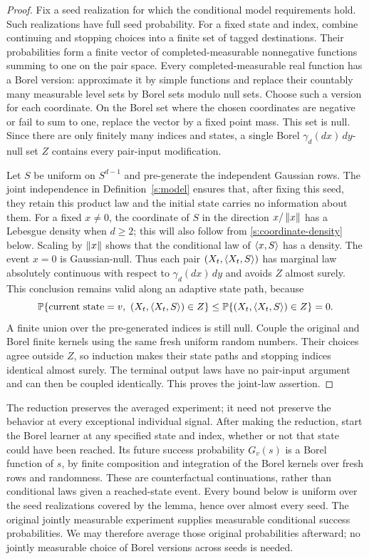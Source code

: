 \begin{proof}
Fix a seed realization for which the conditional model requirements
hold. Such realizations have full seed probability.
For a fixed state and index, combine continuing and stopping choices
into a finite set of tagged destinations. Their probabilities form a
finite vector of completed-measurable nonnegative functions summing to
one on the pair space. Every completed-measurable real function has a
Borel version: approximate it by simple functions and replace their
countably many measurable level sets by Borel sets modulo null sets.
Choose such a version for each coordinate. On the Borel set where the
chosen coordinates are negative or fail to sum to one, replace the
vector by a fixed point mass. This set is null. Since there are only
finitely many indices and states, a single Borel
\(\gamma_d(dx)\,dy\)-null set \(Z\) contains every pair-input
modification.

Let \(S\) be uniform on \(S^{d-1}\) and pre-generate the independent
Gaussian rows. The joint independence in Definition~\ref{s:model}
ensures that, after fixing this seed, they retain this product law and
the initial state carries no information about them. For a fixed
\(x\ne0\), the coordinate of \(S\) in the
direction \(x/\left\lVert x\right\rVert\) has a Lebesgue density when \(d\ge2\); this
will also follow from \eqref{s:coordinate-density} below. Scaling by
\(\left\lVert x\right\rVert\) shows that the conditional law of \(\langle x,S\rangle\) has a
density. The event \(x=0\) is Gaussian-null. Thus each pair
\((X_t,\langle X_t,S\rangle)\) has marginal law absolutely continuous with
respect to \(\gamma_d(dx)\,dy\) and avoids \(Z\) almost surely.
This conclusion remains valid along an adaptive state path, because
\[
 \mathbb P\{\text{current state}=v,\ (X_t,\langle X_t,S\rangle)\in Z\}
 \le \mathbb P\{(X_t,\langle X_t,S\rangle)\in Z\}=0.
\]
A finite union over the pre-generated indices is still null. Couple the
original and Borel finite kernels using the same fresh uniform random
numbers. Their choices agree outside \(Z\), so induction makes their
state paths and stopping indices identical almost surely. The terminal
output laws have no pair-input argument and can then be coupled
identically. This proves the joint-law assertion.
\end{proof}

The reduction preserves the averaged experiment; it need not preserve
the behavior at every exceptional individual signal. After making the
reduction, start the Borel learner at any specified state and index,
whether or not that state could have been reached. Its future success
probability \(G_v(s)\) is a Borel function of \(s\), by finite
composition and integration of the Borel kernels over fresh rows and
randomness. These are counterfactual continuations, rather than
conditional laws given a reached-state event.
Every bound below is uniform over the seed realizations covered by
the lemma, hence over almost every seed.
The original jointly measurable experiment supplies measurable
conditional success probabilities. We may therefore average those
original probabilities afterward; no jointly measurable choice of
Borel versions across seeds is needed.

